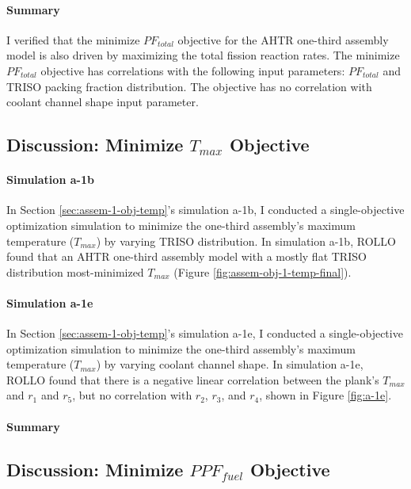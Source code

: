 \paragraph{Summary}
I verified that the minimize $PF_{total}$ objective for the \gls{AHTR} one-third assembly 
model is also driven by maximizing the total fission reaction rates. 
The minimize $PF_{total}$ objective has correlations with the following input parameters: 
$PF_{total}$ and TRISO packing fraction distribution. 
The objective has no correlation with coolant channel shape input parameter. 

\subsection{Discussion: Minimize $T_{max}$ Objective}
\label{sec:assem-discussion-temp}

\paragraph{Simulation a-1b}
In Section \ref{sec:assem-1-obj-temp}'s simulation a-1b, I conducted a single-objective 
optimization simulation to minimize the one-third assembly's maximum temperature 
($T_{max}$) by varying TRISO distribution. 
In simulation a-1b, \gls{ROLLO} found that an \gls{AHTR} one-third assembly model with 
a mostly flat TRISO distribution most-minimized $T_{max}$ 
(Figure \ref{fig:assem-obj-1-temp-final}).

\paragraph{Simulation a-1e}
In Section \ref{sec:assem-1-obj-temp}'s simulation a-1e, I conducted a single-objective 
optimization simulation to minimize the one-third assembly's maximum temperature 
($T_{max}$) by varying coolant channel shape. 
In simulation a-1e, \gls{ROLLO} found that there is a negative linear correlation 
between the plank's $T_{max}$ and $r_1$ and $r_5$, but no correlation with 
$r_2$, $r_3$, and $r_4$, shown in Figure \ref{fig:a-1e}. 

\paragraph{Summary}


\subsection{Discussion: Minimize $PPF_{fuel}$ Objective}
\label{sec:assem-discussion-ppf}
